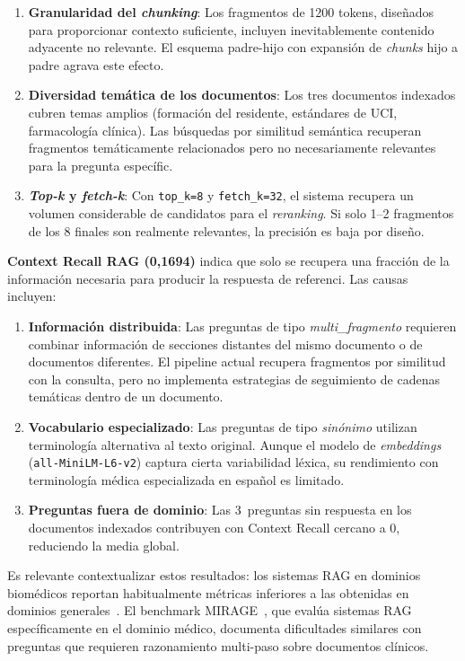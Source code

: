 \begin{enumerate}[leftmargin=*]
  \item \textbf{Granularidad del \textit{chunking}}: Los fragmentos de 1200 tokens, diseñados para proporcionar contexto suficiente, incluyen inevitablemente contenido adyacente no relevante. El esquema padre-hijo con expansión de \textit{chunks} hijo a padre agrava este efecto.
  \item \textbf{Diversidad temática de los documentos}: Los tres documentos indexados cubren temas amplios (formación del residente, estándares de \ac{UCI}, farmacología clínica). Las búsquedas por similitud semántica recuperan fragmentos temáticamente relacionados pero no necesariamente relevantes para la pregunta específic.
  \item \textbf{\textit{Top-k} y \textit{fetch-k}}: Con \texttt{top\_k=8} y \texttt{fetch\_k=32}, el sistema recupera un volumen considerable de candidatos para el \textit{reranking}. Si solo 1--2 fragmentos de los 8 finales son realmente relevantes, la precisión es baja por diseño.
\end{enumerate}

\textbf{Context Recall \ac{RAG} (0,1694)} indica que solo se recupera una fracción de la información necesaria para producir la respuesta de referenci. Las causas incluyen:

\begin{enumerate}[leftmargin=*]
  \item \textbf{Información distribuida}: Las preguntas de tipo \textit{multi\_fragmento} requieren combinar información de secciones distantes del mismo documento o de documentos diferentes. El pipeline actual recupera fragmentos por similitud con la consulta, pero no implementa estrategias de seguimiento de cadenas temáticas dentro de un documento.
  \item \textbf{Vocabulario especializado}: Las preguntas de tipo \textit{sinónimo} utilizan terminología alternativa al texto original. Aunque el modelo de \textit{embeddings} (\texttt{all-MiniLM-L6-v2}) captura cierta variabilidad léxica, su rendimiento con terminología médica especializada en español es limitado.
  \item \textbf{Preguntas fuera de dominio}: Las 3~preguntas sin respuesta en los documentos indexados contribuyen con Context Recall cercano a 0, reduciendo la media global.
\end{enumerate}

Es relevante contextualizar estos resultados: los sistemas \ac{RAG} en dominios biomédicos reportan habitualmente métricas inferiores a las obtenidas en dominios generales~\parencite{xiong2024medrag,Amugongo2025systematic}. El benchmark MIRAGE~\parencite{xiong2024medrag}, que evalúa sistemas \ac{RAG} específicamente en el dominio médico, documenta dificultades similares con preguntas que requieren razonamiento multi-paso sobre documentos clínicos.



